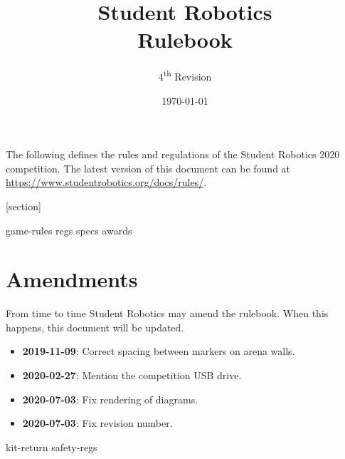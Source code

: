 \documentclass[a4paper, 11pt]{scrartcl}
\title {Student Robotics \sryear\\ Rulebook}
\author{4\textsuperscript{th} Revision}
\date{\today}
\newcommand{\sryear}{2020}
\begin{document}
\maketitle

\noindent The following defines the rules and regulations of the Student Robotics \sryear {} competition.  The latest version of this document can be found at \url{https://www.studentrobotics.org/docs/rules/}.

[section]
\newcommand{\rcn}{\stepcounter{rule}\arabic{section}.\arabic{rule}}
\newcommand{\rcnappendix}{\stepcounter{rule}\Alph{section}.\arabic{rule}}
\renewcommand{\labelenumi}{\rcn}

 {game-rules}
\newpage
 {regs}
\newpage
 {specs}
\newpage
 {awards}

\renewcommand{\labelenumi}{\rcn}

\section{Amendments}
From time to time Student Robotics may amend the rulebook.  When this happens, this document will be updated.

\begin{itemize}
\item \textbf{2019-11-09}: Correct spacing between markers on arena walls.
\item \textbf{2020-02-27}: Mention the competition USB drive.
\item \textbf{2020-07-03}: Fix rendering of diagrams.
\item \textbf{2020-07-03}: Fix revision number.
\end{itemize}

\newpage
\appendix
\renewcommand{\labelenumi}{\rcnappendix}
\appendixpage
\addappheadtotoc
 {kit-return}
 {safety-regs}
\end{document}
